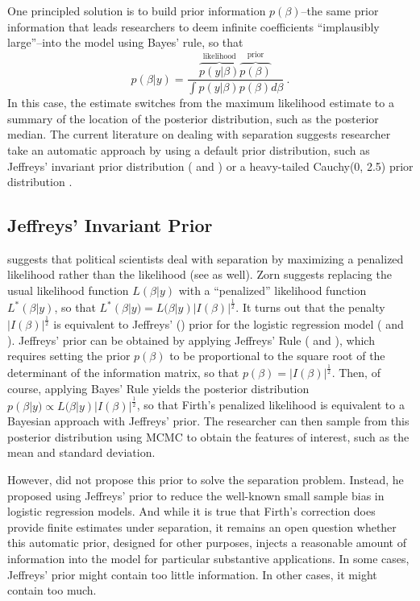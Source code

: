 \documentclass[12pt]{article}
\begin{document}
One principled solution is to build prior information $p(\beta)$--the same prior information that leads researchers to deem infinite coefficients ``implausibly large''--into the model using Bayes' rule, so that 
\begin{equation}\nonumber
p(\beta|y) = \dfrac{\overbrace{p(y|\beta)}^{\text{likelihood}}\overbrace{p(\beta)}^{\text{prior}}}{\int p(y|\beta)p(\beta) d\beta}~\text{.}
\end{equation}
\noindent In this case, the estimate switches from the maximum likelihood estimate to a summary of the location of the posterior distribution, such as the posterior median. 
The current literature on dealing with separation suggests researcher take an automatic approach by using a default prior distribution, such as Jeffreys' invariant prior distribution (\citealt{Jeffreys1946} and \citealt{Zorn2005}) or a heavy-tailed Cauchy(0, 2.5) prior distribution \citep{Gelmanetal2008}.

\subsection*{Jeffreys' Invariant Prior}

\cite{Zorn2005} suggests that political scientists deal with separation by maximizing a penalized likelihood rather than the likelihood (see \citealt{HeinzeSchemper2002} as well). 
Zorn suggests replacing the usual likelihood function $L(\beta | y)$ with a ``penalized'' likelihood function $L^*(\beta | y)$, so that $L^*(\beta | y) = L(\beta | y)|I(\beta)|^\frac{1}{2}$. 
It turns out that the penalty $|I(\beta)|^\frac{1}{2}$ is equivalent to Jeffreys' (\citeyear{Jeffreys1946}) prior for the logistic regression model (\citealt{Firth1993} and \citealt{Poirier1994}). 
Jeffreys' prior can be obtained by applying Jeffreys' Rule (\citealt{Jeffreys1946} and \citealt[pp. 41-60]{BoxTaio2011}), which requires setting the prior $p(\beta)$ to be proportional to the square root of the determinant of the information matrix, so that $p(\beta) = |I(\beta)|^\frac{1}{2}$. 
Then, of course, applying Bayes' Rule yields the posterior distribution $p(\beta | y) \propto L(\beta | y)|I(\beta)|^\frac{1}{2}$, so that Firth's penalized likelihood is equivalent to a Bayesian approach with Jeffreys' prior. 
The researcher can then sample from this posterior distribution using MCMC to obtain the features of interest, such as the mean and standard deviation.

However, \cite{Firth1993} did not propose this prior to solve the separation problem. 
Instead, he proposed using Jeffreys' prior to reduce the well-known small sample bias in logistic regression models. 
And while it is true that Firth's correction does provide finite estimates under separation, it remains an open question whether this automatic prior, designed for other purposes, injects a reasonable amount of information into the model for particular substantive applications. 
In some cases, Jeffreys' prior might contain too little information. In other cases, it might contain too much.
\end{document}
